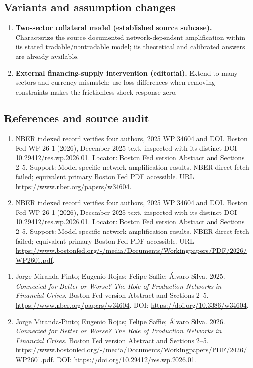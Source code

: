 \documentclass[11pt,a4paper]{article}
\begin{document}
\subsection*{Variants and assumption changes}
\begin{enumerate}
\item \textbf{Two-sector collateral model (established source subcase).} Characterize the source documented network-dependent amplification within its stated tradable/nontradable model; its theoretical and calibrated answers are already available.
\item \textbf{External financing-supply intervention (editorial).} Extend to many sectors and currency mismatch; use loss differences when removing constraints makes the frictionless shock response zero.
\end{enumerate}
\subsection*{References and source audit}
\begin{enumerate}
\item NBER indexed record verifies four authors, 2025 WP 34604 and DOI. Boston Fed WP 26-1 (2026), December 2025 text, inspected with its distinct DOI 10.29412/res.wp.2026.01. Locator: Boston Fed version Abstract and Sections 2--5. Support: Model-specific network amplification results. NBER direct fetch failed; equivalent primary Boston Fed PDF accessible. URL: \url{https://www.nber.org/papers/w34604}.
\item NBER indexed record verifies four authors, 2025 WP 34604 and DOI. Boston Fed WP 26-1 (2026), December 2025 text, inspected with its distinct DOI 10.29412/res.wp.2026.01. Locator: Boston Fed version Abstract and Sections 2--5. Support: Model-specific network amplification results. NBER direct fetch failed; equivalent primary Boston Fed PDF accessible. URL: \url{https://www.bostonfed.org/-/media/Documents/Workingpapers/PDF/2026/WP2601.pdf}.
\end{enumerate}
\begin{enumerate}\raggedright
\item\hypertarget{definitions:source:30007618:1}{} Jorge Miranda-Pinto; Eugenio Rojas; Felipe Saffie; Álvaro Silva. 2025. \emph{Connected for Better or Worse? The Role of Production Networks in Financial Crises}. Boston Fed version Abstract and Sections 2--5.
\url{https://www.nber.org/papers/w34604}.
DOI: \url{https://doi.org/10.3386/w34604}.
\item\hypertarget{definitions:source:30007618:2}{} Jorge Miranda-Pinto; Eugenio Rojas; Felipe Saffie; Álvaro Silva. 2026. \emph{Connected for Better or Worse? The Role of Production Networks in Financial Crises}. Boston Fed version Abstract and Sections 2--5.
\url{https://www.bostonfed.org/-/media/Documents/Workingpapers/PDF/2026/WP2601.pdf}.
DOI: \url{https://doi.org/10.29412/res.wp.2026.01}.
\end{enumerate}
\end{document}
